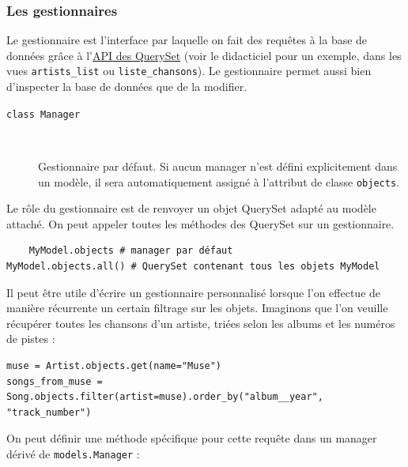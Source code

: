 \documentclass[a4paper, 10pt]{article}
\begin{document}
\subsubsection{Les gestionnaires}
Le gestionnaire  est l'interface par laquelle on fait des requêtes à la base de données grâce à l'\href{https://docs.djangoproject.com/fr/2.2/ref/models/querysets/}{API des QuerySet} (voir le didacticiel pour un exemple, dans les vues \texttt{artists_list} ou \texttt{liste_chansons}). Le gestionnaire permet aussi bien d'inspecter la base de données que de la modifier.

\begin{description}
    \item[\texttt{class Manager}]~
    
          Gestionnaire par défaut. Si aucun manager n'est défini explicitement dans un modèle, il sera automatiquement assigné à l'attribut de classe \texttt{objects}.
        \end{description}

        Le rôle du gestionnaire est de renvoyer un objet QuerySet adapté au modèle attaché. On peut appeler toutes les méthodes des QuerySet sur un gestionnaire.

\begin{verbatim}
    MyModel.objects # manager par défaut
MyModel.objects.all() # QuerySet contenant tous les objets MyModel
\end{verbatim}

Il peut être utile d'écrire un gestionnaire personnalisé lorsque l'on effectue de manière récurrente un certain filtrage sur les objets. Imaginons que l'on veuille récupérer toutes les chansons d'un artiste, triées selon les albums et les numéros de pistes :

\begin{verbatim}
muse = Artist.objects.get(name="Muse")
songs_from_muse = Song.objects.filter(artist=muse).order_by("album__year", "track_number")
\end{verbatim}

On peut définir une méthode spécifique pour cette requête dans un manager dérivé de \texttt{models.Manager} :
\end{document}
